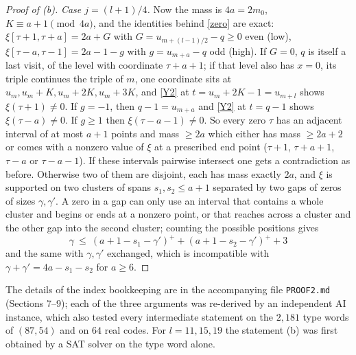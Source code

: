 \documentclass[11pt]{article}
\theoremstyle{remark}
\newcommand{\pos}[1]{(#1)^{+}}
\begin{document}
\begin{proof}[Proof of (b)]
\emph{Case $j=(l+1)/4$.} Now the mass is $4a=2m_0$, $K\equiv a+1 \pmod{4a}$, and the identities behind \eqref{zero} are exact:
$\xi[\tau+1,\tau+a]=2a+G$ with $G=u_{m+(l-1)/2}-q\ge 0$ even (low), $\xi[\tau-a,\tau-1]=2a-1-g$ with $g=u_{m+a}-q$ odd (high).
If $G=0$, $q$ is itself a last visit, of the level with coordinate $\tau+a+1$; if that level also has $x=0$, its triple
continues the triple of $m$, one coordinate sits at $u_m,u_m+K,u_m+2K,u_m+3K$, and \eqref{Y2} at $t=u_m+2K-1=u_{m+l}$ shows
$\xi(\tau+1)\ne 0$. If $g=-1$, then $q-1=u_{m+a}$ and \eqref{Y2} at $t=q-1$ shows $\xi(\tau-a)\ne0$. If $g\ge 1$ then $\xi(\tau-a-1)\ne 0$.
So every zero $\tau$ has an adjacent interval of at most $a+1$ points and mass $\ge 2a$ which either has mass $\ge 2a+2$ or comes with
a nonzero value of $\xi$ at a prescribed end point ($\tau+1$, $\tau+a+1$, $\tau-a$ or $\tau-a-1$). If these intervals pairwise intersect
one gets a contradiction as before. Otherwise two of them are disjoint, each has mass exactly $2a$, and $\xi$ is supported on two
clusters of spans $s_1,s_2\le a+1$ separated by two gaps of zeros of sizes $\gamma,\gamma'$. A zero in a gap can only use an interval that
contains a whole cluster and begins or ends at a nonzero point, or that reaches across a cluster and the other gap into the second
cluster; counting the possible positions gives
\[ \gamma\ \le\ \pos{a+1-s_1-\gamma'}+\pos{a+1-s_2-\gamma'}+3 \]
and the same with $\gamma,\gamma'$ exchanged, which is incompatible with $\gamma+\gamma'=4a-s_1-s_2$ for $a\ge 6$.
\end{proof}
\noindent The details of the index bookkeeping are in the accompanying file \texttt{PROOF2.md} (Sections 7--9); each of the three
arguments was re-derived by an independent AI instance, which also tested every intermediate statement on the $2{,}181$ type words
of $(87,54)$ and on $64$ real codes. For $l=11,15,19$ the statement (b) was first obtained by a SAT solver on the type word alone.
\end{document}

